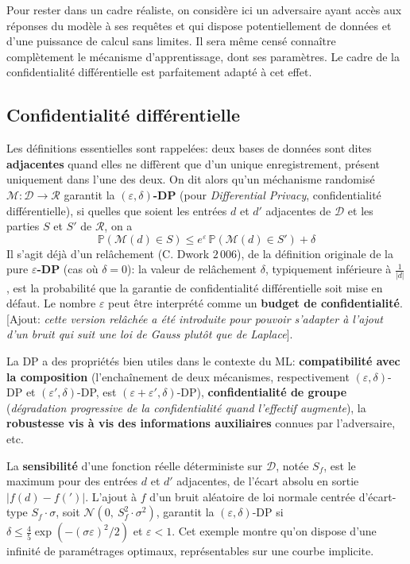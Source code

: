 \documentclass[a4paper,11pt]{article} %
\newcommand{\evid}[1]{\colorbox{blue!10}{\textbf{#1}}}
\begin{document}
Pour rester dans un cadre réaliste, on considère ici un adversaire ayant accès aux réponses du modèle à ses requêtes et qui dispose potentiellement de données et d'une puissance de calcul sans limites. Il sera même censé connaître complètement le mécanisme d'apprentissage, dont ses paramètres. Le cadre de la confidentialité différentielle est parfaitement adapté à cet effet.
%
\subsection{Confidentialité différentielle}
%
Les définitions essentielles sont rappelées: deux bases de données sont dites \evid{adjacentes} quand elles ne diffèrent que d'un unique enregistrement, présent uniquement dans l'une des deux. On dit alors qu'un méchanisme randomisé $\mathcal{M}: \mathcal{D}\to\mathcal{R}$ garantit la \evid{$(\varepsilon, \delta)$-DP} (pour \emph{Differential Privacy}, confidentialité différentielle), si quelles que soient les entrées $d$ et $d'$ adjacentes de $\mathcal{D}$ et les parties $S$ et $S'$ de $\mathcal{R}$, on a
\[ \mathbb{P}\left(\mathcal{M}(d) \in S\right)   \leqslant  e^\varepsilon \, \mathbb{P}\left(\mathcal{M}(d) \in S'\right) + \delta\]
Il s'agit déjà d'un relâchement (C. Dwork $2\,006$), de la définition originale de la \og pure\fg{} \evid{$\varepsilon$-DP} (cas où $\delta=0$): la valeur de relâchement $\delta$, typiquement inférieure à $\frac{1}{|d|}$, est la probabilité que la garantie de confidentialité différentielle soit mise en défaut. Le nombre $\varepsilon$ peut être interprété comme un \evid{budget de confidentialité}. [Ajout: \emph{cette version relâchée a été introduite pour pouvoir s'adapter à l'ajout d'un bruit qui suit une loi de Gauss plutôt que de Laplace}].

La DP a des propriétés bien utiles dans le contexte du ML: \textbf{compatibilité avec la composition} (l'enchaînement de deux mécanismes, respectivement $(\varepsilon, \delta)$-DP et $(\varepsilon', \delta)$-DP, est $(\varepsilon + \varepsilon', \delta)$-DP), \textbf{confidentialité de groupe} (\emph{dégradation progressive de la confidentialité quand l'effectif augmente}),  la \textbf{robustesse vis à vis des informations auxiliaires} connues par l'adversaire, etc.

La \evid{sensibilité} d'une fonction réelle déterministe sur $\mathcal{D}$, notée $S_f$, est le maximum pour des entrées $d$ et $d'$ adjacentes, de l'écart absolu en sortie $|f(d)-f(')|$. L'ajout à $f$ d'un bruit aléatoire de loi normale centrée d'écart-type $S_f \cdot \sigma$, soit $\mathcal{N}(0,\ S_f^2 \cdot \sigma^2)$, garantit la $(\varepsilon, \delta)$-DP si $\delta \leqslant \frac{4}{5}\exp (-(\sigma\varepsilon)^2/2)$ et $\varepsilon < 1$. Cet exemple montre qu'on dispose d'une infinité de paramétrages optimaux, représentables sur une courbe implicite.
%
\end{document}

